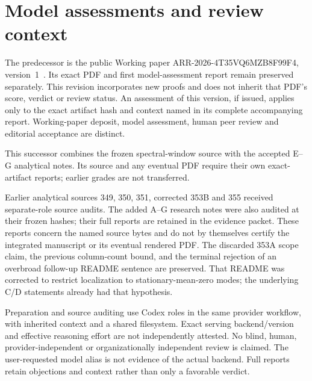 \documentclass[11pt]{article}
\begin{document}
\section{Model assessments and review context}
The predecessor is the public Working paper ARR-2026-4T35VQ6MZB8F99F4, version~1~\cite{predecessor}. Its exact PDF and first model-assessment report remain preserved separately. This revision incorporates new proofs and does not inherit that PDF's score, verdict or review status. An assessment of this version, if issued, applies only to the exact artifact hash and context named in its complete accompanying report. Working-paper deposit, model assessment, human peer review and editorial acceptance are distinct.

This successor combines the frozen spectral-window source with the accepted E--G analytical notes. Its source and any eventual PDF require their own exact-artifact reports; earlier grades are not transferred.

Earlier analytical sources 349, 350, 351, corrected 353B and 355 received separate-role source audits. The added A--G research notes were also audited at their frozen hashes; their full reports are retained in the evidence packet. These reports concern the named source bytes and do not by themselves certify the integrated manuscript or its eventual rendered PDF. The discarded 353A scope claim, the previous column-count bound, and the terminal rejection of an overbroad follow-up README sentence are preserved. That README was corrected to restrict localization to stationary-mean-zero modes; the underlying C/D statements already had that hypothesis.

Preparation and source auditing use Codex roles in the same provider workflow, with inherited context and a shared filesystem. Exact serving backend/version and effective reasoning effort are not independently attested. No blind, human, provider-independent or organizationally independent review is claimed. The user-requested model alias is not evidence of the actual backend. Full reports retain objections and context rather than only a favorable verdict.
\end{document}
